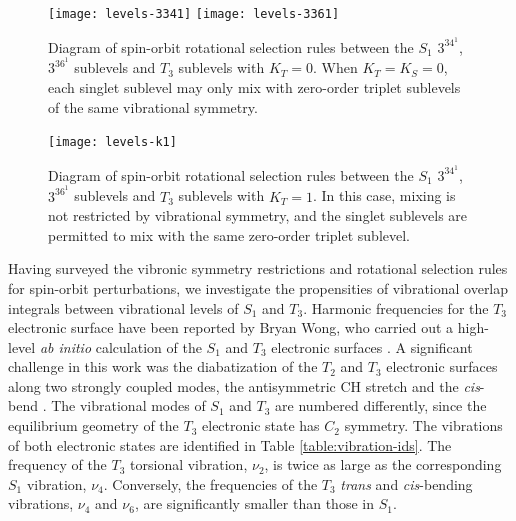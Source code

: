 \begin{figure}
  \caption{Diagram of spin-orbit rotational selection rules between
    the $S_1$ $3^34^1$, $3^36^1$  sublevels and $T_3$ sublevels
    with $K_T=0$.  When $K_T=K_S=0$, each singlet sublevel may only
    mix with zero-order triplet sublevels of the same vibrational
    symmetry.}
  \label{fig:levels-k0}
  \centering
  \vspace{5mm}
  \texttt{[image: levels-3341]}
  \texttt{[image: levels-3361]}  
\end{figure}

\begin{figure}
  \caption{Diagram of spin-orbit rotational selection rules between
    the $S_1$ $3^34^1$, $3^36^1$  sublevels and $T_3$ sublevels
    with $K_T=1$.  In this case, mixing is not restricted by
    vibrational symmetry, and the singlet sublevels are permitted to
    mix with the same zero-order triplet sublevel.}
  \label{fig:levels-k1}
  \centering
  \vspace{5mm}
  \texttt{[image: levels-k1]}
\end{figure}


Having surveyed the vibronic symmetry restrictions and rotational
selection rules for spin-orbit perturbations, we investigate the
propensities of vibrational overlap integrals between vibrational
levels of $S_1$ and $T_3$.  Harmonic frequencies for the $T_3$
electronic surface have been reported by Bryan Wong, who carried out a
high-level \emph{ab initio} calculation of the $S_1$ and $T_3$
electronic surfaces \cite{wong07}.  A significant challenge in this
work was the diabatization of the $T_2$ and $T_3$ electronic surfaces
along two strongly coupled modes, the antisymmetric CH stretch and the
\emph{cis}-bend \cite{thom07}.  The vibrational modes of $S_1$ and
$T_3$ are numbered differently, since the equilibrium geometry of the
$T_3$ electronic state has $C_2$ symmetry.  The vibrations of both
electronic states are identified in Table \ref{table:vibration-ids}.
The frequency of the $T_3$ torsional vibration, $\nu_2$, is twice as
large as the corresponding $S_1$ vibration, $\nu_4$.  Conversely, the
frequencies of the $T_3$ \emph{trans} and \emph{cis}-bending
vibrations, $\nu_4$ and $\nu_6$, are significantly smaller than those
in $S_1$.

